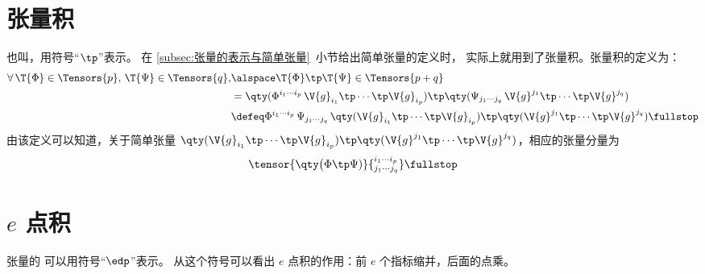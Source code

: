 \section{张量积} \label{sec:张量积}
也叫，用符号“$\tp$”表示。
在 \ref{subsec:张量的表示与简单张量}~小节给出简单张量的定义时，
实际上就用到了张量积。张量积的定义为：
\begin{align}
	\forall\,\T{\Phi}\in\Tensors{p},\,\T{\Psi}\in\Tensors{q},
	&\alspace \T{\Phi}\tp\T{\Psi}
		\in\Tensors{p+q} \notag \\
	&=\qty(\Phi^{i_1 \cdots i_p} \,
			\V{g}_{i_1}\tp\cdots\tp\V{g}_{i_p})
		\tp \qty(\Psi_{j_1 \cdots j_q} \,
			\V{g}^{j_1}\tp\cdots\tp\V{g}^{j_q}) \notag \\
	&\defeq \Phi^{i_1 \cdots i_p} \,
		\Psi_{j_1 \cdots j_q}\,
		\qty(\V{g}_{i_1}\tp\cdots\tp\V{g}_{i_p})
		\tp \qty(\V{g}^{j_1}\tp\cdots
			\tp\V{g}^{j_q}_{\phantom{i_p}}) \fullstop
\end{align}
由该定义可以知道，关于简单张量 $\qty(\V{g}_{i_1}\tp\cdots
	\tp\V{g}_{i_p}) \tp \qty(\V{g}^{j_1}\tp\cdots
	\tp\V{g}^{j_q}_{\phantom{i_p}})$，相应的张量分量为
\begin{equation}
	\tensor{\qty\big(\Phi\tp\Psi)}
		{^{i_1 \cdots i_p}_{j_1 \cdots j_q}} \fullstop
\end{equation}

\section{\texorpdfstring{$e$ 点积}{e 点积}}
张量的 可以用符号“$\edp$”表示。
从这个符号可以看出 $e$ 点积的作用：前 $e$ 个指标缩并，后面的点乘。

